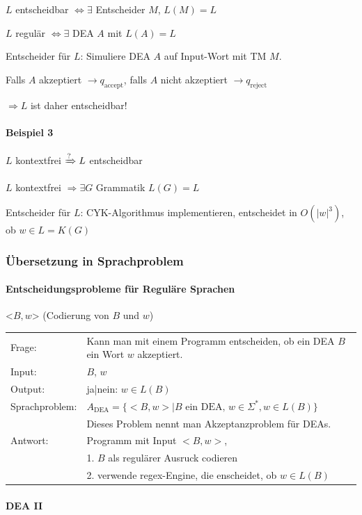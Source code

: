  $L$ entscheidbar $\Leftrightarrow \exists$ Entscheider $M$, $L(M) = L$
 
 $L$ regulär $\Leftrightarrow \exists$ DEA $A$ mit $L(A) = L$
 
 Entscheider für $L$: Simuliere DEA $A$ auf Input-Wort mit TM $M$.
 
 Falls $A$ akzeptiert $\rightarrow q_\text{accept}$, falls $A$ nicht akzeptiert $\rightarrow q_\text{reject}$
 
 $\Rightarrow L$ ist daher entscheidbar!
 
 \paragraph{Beispiel 3}
 
 $L$ kontextfrei $\xRightarrow ? L$ entscheidbar
 
 $L$ kontextfrei $\Rightarrow \exists G$ Grammatik $L(G)=L$
 
 Entscheider für $L$: CYK-Algorithmus implementieren, entscheidet in $O(|w|^3)$, ob $w \in L = K(G)$
 
\subsubsection{Übersetzung in Sprachproblem}
 \paragraph{Entscheidungsprobleme für Reguläre Sprachen}
 
 <$B,w$> (Codierung von $B$ und $w$)
 
 \begin{tabular}{l l}
 Frage: &Kann man mit einem Programm entscheiden, ob ein DEA $B$ ein Wort $w$ akzeptiert. \\
 Input: &$B$, $w$ \\ 
 Output: &ja|nein: $w \in L(B)$ \\
Sprachproblem: & $ A_\text{DEA} = \{ <B,w> | B \text{ ein DEA, } w \in \Sigma^\ast, w \in L(B) \} $ \\
& Dieses Problem nennt man Akzeptanzproblem für DEAs. \\
Antwort: &Programm mit Input $<B,w>$, \\
&1. $B$ als regulärer Ausruck codieren \\
&2. verwende regex-Engine, die enscheidet, ob $w \in L(B)$
\end{tabular}

\paragraph{DEA II} \hfill \\


